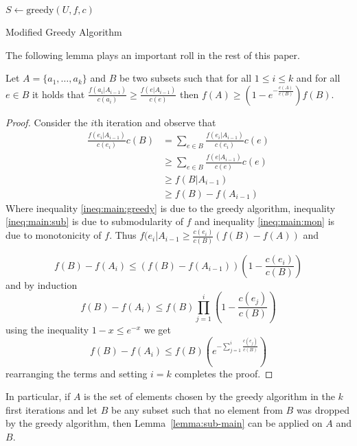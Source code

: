 \begin{algorithm}[H]
\label{alg:mgreedy}



$S \leftarrow \text{greedy}(U, f, c)$
\\
\caption{Modified Greedy Algorithm}
\end{algorithm}

The following lemma plays an important roll in the rest of this paper.

\begin{lemma}
\label{lemma:sub-main}
Let $A = \{a_1, \dots, a_k\}$ and $B$ be two subsets such that for all $1 \leq i \leq k$ 
and for all $e \in B$ it holds that 
$\frac{f(a_i|A_{i-1})}{c(a_i)} \geq \frac{f(e|A_{i-1})}{c(e)}$
then $f(A) \geq (1 - e^{-\frac{c(A)}{c(B)}})f(B)$.
\end{lemma} 

\begin{proof}
Consider the $i$th iteration and observe that 
\begin{align}
	\frac{f(e_i|A_{i-1})}{c(e_i)}c(B) 
	& = \sum_{e \in B} \frac{f(e_i|A_{i-1})}{c(e_i)}c(e)
	\label{ineq:main:greedy}
	\\ 	& \geq \sum_{e \in B} \frac{f(e|A_{i-1})}{c(e)}c(e)
	\label{ineq:main:sub}
	\\	& \geq f(B|A_{i-1})
	\label{ineq:main:mon}
	\\ 	& \geq f(B) - f(A_{i-1})
\end{align}
Where inequality \ref{ineq:main:greedy} is due to the greedy algorithm, inequality \ref{ineq:main:sub} is due to submodularity of $f$ and inequality \ref{ineq:main:mon} is due to monotonicity of $f$.
Thus $f(e_i|A_{i-1} \geq \frac{c(e_i)}{c(B)}(f(B) - f(A))$ and

$$
f(B) - f(A_i)  \leq (f(B) - f(A_{i - 1}))(1 - \frac{c(e_i)}{c(B)})
$$
and by induction
$$
f(B) - f(A_i)  \leq f(B) \prod_{j = 1}^{i}(1 - \frac{c(e_j)}{c(B)})
$$
using the inequality $1 - x \leq e^{-x}$ we get
$$
f(B) - f(A_i)  \leq f(B) (e^{-\sum_{j = 1}^{i}\frac{c(e_j)}{c(B)}})
$$
rearranging the terms and setting $i = k$ completes the proof.
\end{proof}

In particular, if $A$ is the set of elements chosen by the greedy algorithm in 
the $k$ first iterations and let $B$ be any subset such that no element from $B$ was dropped
by the greedy algorithm, 
then Lemma~\ref{lemma:sub-main} can be applied on $A$ and $B$.   




